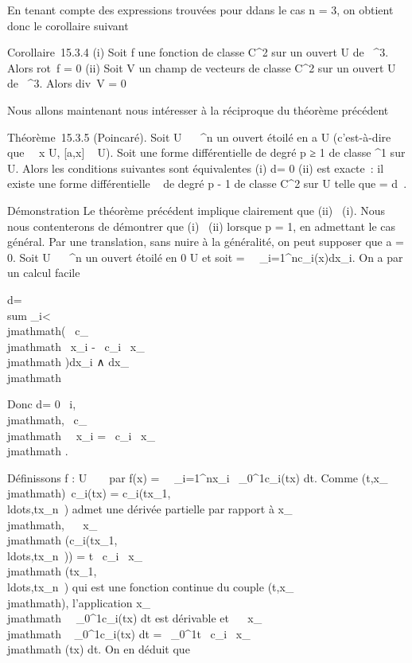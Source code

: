 \documentclass[]{article}
\begin{document}
En tenant compte des expressions trouvées pour d\omega dans le cas n = 3, on
obtient donc le corollaire suivant

Corollaire~15.3.4 (i) Soit f une fonction de classe C^2 sur
un ouvert U de ~^3. Alors
rot\grad~f = 0 (ii)
Soit V un champ de vecteurs de classe C^2 sur un ouvert U de
~^3. Alors
div\rot~V = 0

Nous allons maintenant nous intéresser à la réciproque du théorème
précédent

Théorème~15.3.5 (Poincaré). Soit U \subset~ ~^n un ouvert étoilé en
a \in U (c'est-à-dire que \forall~~x \in U, {[}a,x{]} \subset~
U). Soit \omega une forme différentielle de degré p ≥ 1 de classe
^1 sur U. Alors les conditions suivantes sont équivalentes
(i) d\omega = 0 (ii) \omega est exacte~: il existe une forme différentielle \alpha~ de
degré p - 1 de classe C^2 sur U telle que \omega = d\alpha~.

Démonstration Le théorème précédent implique clairement que (ii) \rigtharrow~(i).
Nous nous contenterons de démontrer que (i) \rigtharrow~(ii) lorsque p = 1, en
admettant le cas général. Par une translation, sans nuire à la
généralité, on peut supposer que a = 0. Soit U \subset~ ~^n un
ouvert étoilé en 0 \in U et soit \omega =\
\sum ~
_i=1^nc_i(x)dx_i. On a par un calcul
facile

d\omega = \\sum
_i\textless{}\\jmathmath\left ( \partial~c_\\jmathmath
\over \partial~x_i - \partial~c_i
\over \partial~x_\\jmathmath \right
)dx_i ∧ dx_\\jmathmath

Donc d\omega = 0 \Leftrightarrow
\forall~i,\\jmathmath, \partial~c_\\jmathmath~ \over
\partial~x_i = \partial~c_i \over \partial~x_\\jmathmath .

Définissons f : U \rightarrow~ ~ par f(x) =\
\sum ~
_i=1^nx_i\int ~
_0^1c_i(tx) dt. Comme
(t,x_\\jmathmath)\mapsto~c_i(tx) =
c_i(tx_1,\\ldots,tx_n~)
admet une dérivée partielle par rapport à x_\\jmathmath,  \partial~
\over \partial~x_\\jmathmath
(c_i(tx_1,\\ldots,tx_n~))
= t \partial~c_i \over \partial~x_\\jmathmath
(tx_1,\\ldots,tx_n~)
qui est une fonction continue du couple (t,x_\\jmathmath), l'application
x_\\jmathmath\mapsto~\int ~
_0^1c_i(tx) dt est dérivable et  \partial~
\over \partial~x_\\jmathmath \int ~
_0^1c_i(tx) dt =\int ~
_0^1t \partial~c_i \over \partial~x_\\jmathmath
(tx) dt. On en déduit que
\end{document}
